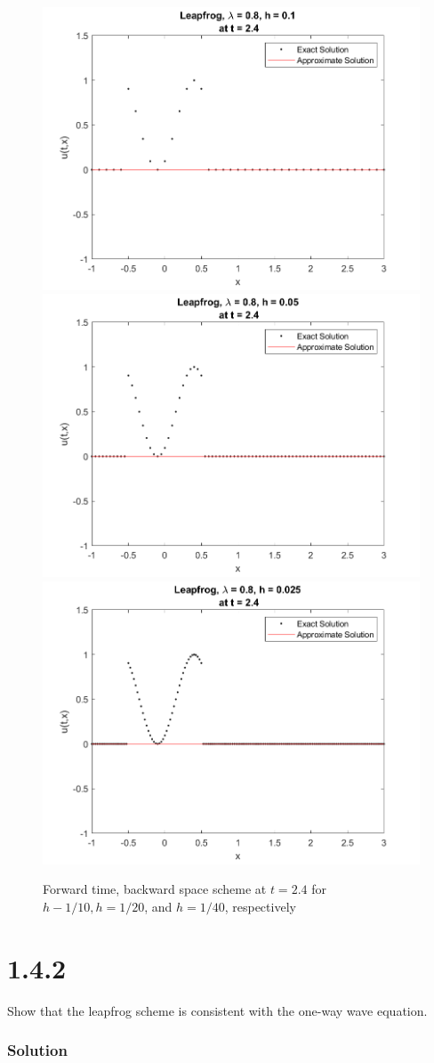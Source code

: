 \documentclass[12pt]{article}
\begin{document}
\begin{figure}
	\centering
	\includegraphics[width=.6\linewidth]{./code/d_leapfrog_h_one_10th.png}	\includegraphics[width=.6\linewidth]{./code/d_leapfrog_h_one_20th.png}
	\includegraphics[width=.6\linewidth]{./code/d_leapfrog_h_one_40th.png}
	\caption{Forward time, backward space scheme at $t=2.4$ for $h-1/10, h=1/20$, and $h=1/40$, respectively}
\end{figure}

\section*{1.4.2}

Show that the leapfrog scheme is consistent with the one-way wave equation.

\subsubsection*{Solution}
\end{document}
